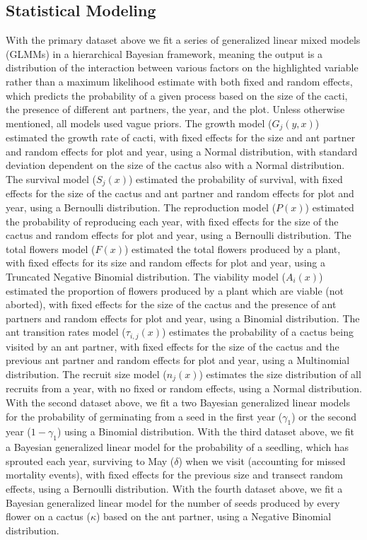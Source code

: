 \documentclass[12pt,a4paper]{article}
\begin{document}
\subsection*{Statistical Modeling}
With the primary dataset above we fit a series of generalized linear mixed models (GLMMs) in a hierarchical Bayesian framework, meaning the output is a distribution of the interaction between various factors on the highlighted variable rather than a maximum likelihood estimate with both fixed and random effects, which predicts the probability of a given process based on the size of the cacti, the presence of different ant partners, the year, and the plot.
Unless otherwise mentioned, all models used vague priors. 
The growth model ($G_j(y,x)$) estimated the growth rate of cacti, with fixed effects for the size and ant partner and random effects for plot and year, using a Normal distribution, with standard deviation dependent on the size of the cactus also with a Normal distribution. 
The survival model ($S_j(x)$) estimated the probability of survival, with fixed effects for the size of the cactus and ant partner and random effects for plot and year, using a Bernoulli distribution. 
The reproduction model ($P(x)$) estimated the probability of reproducing each year, with fixed effects for the size of the cactus and random effects for plot and year, using a Bernoulli distribution. 
The total flowers model ($F(x)$) estimated the total flowers produced by a plant, with fixed effects for its size and random effects for plot and year, using a Truncated Negative Binomial distribution. 
The viability model ($A_i(x)$) estimated the proportion of flowers produced by a plant which are viable (not aborted), with fixed effects for the size of the cactus and the presence of ant partners and random effects for plot and year, using a Binomial distribution.
The ant transition rates model ($\tau_{i,j}(x)$) estimates the probability of a cactus being visited by an ant partner, with fixed effects for the size of the cactus and the previous ant partner and random effects for plot and year, using a Multinomial distribution.  
The recruit size model ($n_j(x)$) estimates the size distribution of all recruits from a year, with no fixed or random effects, using a Normal distribution. 
With the second dataset above, we fit a two Bayesian generalized linear models for the 
probability of germinating from a seed in the first year ($\gamma_1$) or the second year ($1 - \gamma_1$) using a Binomial distribution.
With the third dataset above, we fit a Bayesian generalized linear model for the probability of a seedling, which has sprouted each year, surviving to May ($\delta$) when we visit (accounting for missed mortality events), with fixed effects for the previous size and transect random effects, using a Bernoulli distribution. 
With the fourth dataset above, we fit a Bayesian generalized linear model for the number of seeds produced by every flower on a cactus ($\kappa$) based on the ant partner, using a Negative Binomial distribution. 
\end{document}

